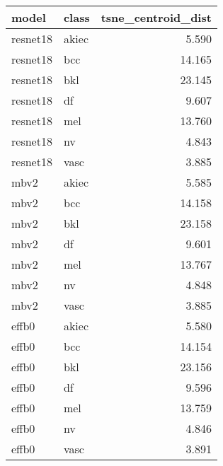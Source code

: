 \begin{tabular}{llr}
\toprule
model & class & tsne_centroid_dist \\
\midrule
resnet18 & akiec & 5.590 \\
resnet18 & bcc & 14.165 \\
resnet18 & bkl & 23.145 \\
resnet18 & df & 9.607 \\
resnet18 & mel & 13.760 \\
resnet18 & nv & 4.843 \\
resnet18 & vasc & 3.885 \\
mbv2 & akiec & 5.585 \\
mbv2 & bcc & 14.158 \\
mbv2 & bkl & 23.158 \\
mbv2 & df & 9.601 \\
mbv2 & mel & 13.767 \\
mbv2 & nv & 4.848 \\
mbv2 & vasc & 3.885 \\
effb0 & akiec & 5.580 \\
effb0 & bcc & 14.154 \\
effb0 & bkl & 23.156 \\
effb0 & df & 9.596 \\
effb0 & mel & 13.759 \\
effb0 & nv & 4.846 \\
effb0 & vasc & 3.891 \\
\bottomrule
\end{tabular}
